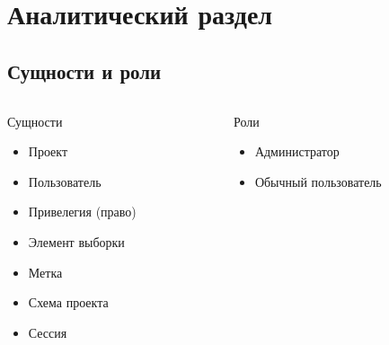 \section{Аналитический раздел}

\subsection{Сущности и роли}

\begin{frame}
\begin{columns}
\begin{column}{0.5\textwidth}
	\begin{center}
		\Large
		Сущности
	\end{center}

\begin{itemize}

	\item Проект

	
	\item Пользователь
	
	
	\item Привелегия (право)
	
	
	\item Элемент выборки
	
	
	\item Метка
	
	
	\item Схема проекта
	
	\item Сессия
	\end{itemize}
\end{column}

\begin{column}{0.5\textwidth}
	\begin{center}
		\Large
		Роли
	\end{center}
\begin{itemize}
\item Администратор

\item Обычный пользователь
\end{itemize}
\end{column}
\end{columns}

\end{frame}

